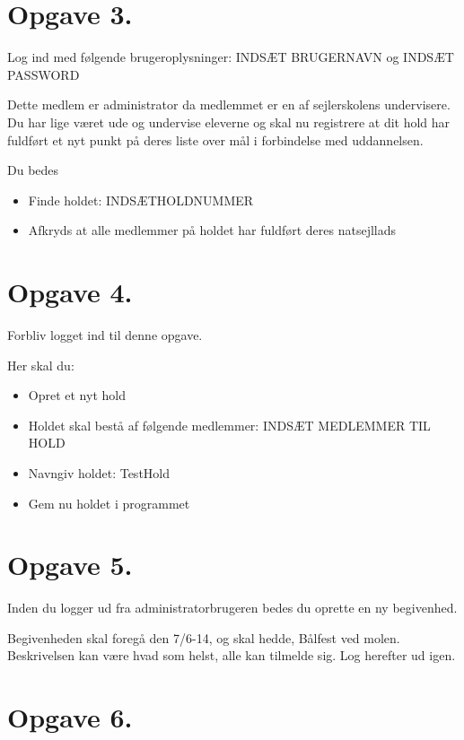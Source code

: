 \newpage
 
\section{Opgave 3.}

Log ind med følgende brugeroplysninger: INDSÆT BRUGERNAVN og INDSÆT PASSWORD

Dette medlem er administrator da medlemmet er en af sejlerskolens undervisere.
Du har lige været ude og undervise eleverne og skal nu registrere at dit hold har fuldført et nyt punkt på deres liste over mål i forbindelse med uddannelsen.

Du bedes 

\begin{itemize}
\item Finde holdet: INDSÆTHOLDNUMMER
\item Afkryds at alle medlemmer på holdet har fuldført deres natsejllads
\end{itemize}


\section{Opgave 4.}

Forbliv logget ind til denne opgave.

Her skal du:
\begin{itemize}
		\item Opret et nyt hold
		\item Holdet skal bestå af følgende medlemmer: INDSÆT MEDLEMMER TIL HOLD
		\item Navngiv holdet: TestHold
		\item Gem nu holdet i programmet
\end{itemize}


\section{Opgave 5.}

Inden du logger ud fra administratorbrugeren bedes du oprette en ny begivenhed.

Begivenheden skal foregå den 7/6-14, og skal hedde, Bålfest ved molen. Beskrivelsen kan være hvad som helst, alle kan tilmelde sig. Log herefter ud igen.



\section{Opgave 6.}

